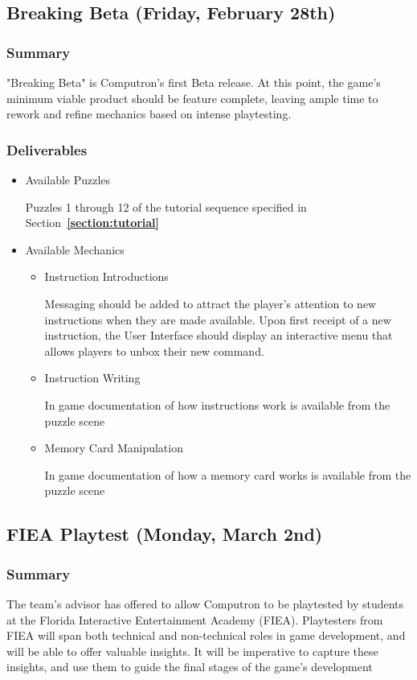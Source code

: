 \subsection{Breaking Beta (Friday, February 28th)}

\subsubsection*{Summary}
"Breaking Beta" is Computron's first Beta release. At this point, the game's minimum viable product should be feature complete, leaving ample time to rework and refine mechanics based on intense playtesting.

\subsubsection*{Deliverables}
\begin{itemize}

  \item Available Puzzles
  
  Puzzles 1 through 12 of the tutorial sequence specified in Section~\textbf{\ref{section:tutorial}}

  \item Available Mechanics
  \begin{itemize}
    \item Instruction Introductions
    
    Messaging should be added to attract the player's attention to new instructions when they are made available. Upon first receipt of a new instruction, the User Interface should display an interactive menu that allows players to unbox their new command.

    \item Instruction Writing
    
    In game documentation of how instructions work is available from the puzzle scene

    \item Memory Card Manipulation
    
    In game documentation of how a memory card works is available from the puzzle scene
  \end{itemize}
\end{itemize}

\subsection{FIEA Playtest (Monday, March 2nd)}
\subsubsection*{Summary}
The team's advisor has offered to allow Computron to be playtested by students at the Florida Interactive Entertainment Academy (FIEA). Playtesters from FIEA will span both technical and non-technical roles in game development, and will be able to offer valuable insights. It will be imperative to capture these insights, and use them to guide the final stages of the game's development

